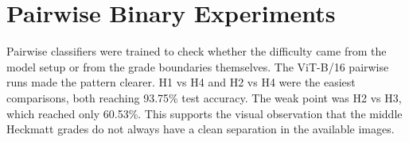 ﻿\documentclass[12pt,a4paper]{report}
\begin{document}
\begin{table}[H]
\centering
\scriptsize
{}
\caption{Selected hyperparameter search results}
\label{tab:hparam_search}
\end{table}

\section{Pairwise Binary Experiments}
Pairwise classifiers were trained to check whether the difficulty came from the model setup or from the grade boundaries themselves. The ViT-B/16 pairwise runs made the pattern clearer. H1 vs H4 and H2 vs H4 were the easiest comparisons, both reaching 93.75\% test accuracy. The weak point was H2 vs H3, which reached only 60.53\%. This supports the visual observation that the middle Heckmatt grades do not always have a clean separation in the available images.

\begin{table}[H]
\centering
\scriptsize
{}
\caption{ViT-B/16 pairwise binary classification results}
\label{tab:vit_pairwise}
\end{table}
\end{document}
